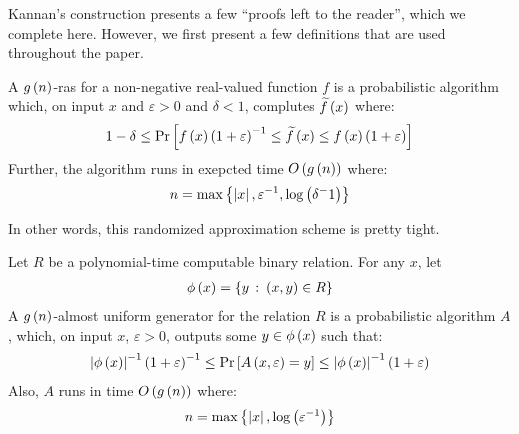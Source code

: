 Kannan's construction presents a few ``proofs left to the reader'',
which we complete here.
However, we first present a few definitions that are used throughout
the paper.

\begin{definition}
  A \(g\left(n\right)\)-ras for a non-negative real-valued function
  \(f\) is a probabilistic algorithm which,
  on input \(x\) and \(\varepsilon > 0\) and \(\delta < 1\),
  complutes \(\widetilde{f}\left(x\right)\) where:
  \begin{align*}
    1 - \delta \leq
    \mathrm{Pr}\left[
      f\left(x\right) \left(1 + \varepsilon\right)^{-1}
        \leq \widetilde{f}\left(x\right)
        \leq f\left(x\right) \left(1 + \varepsilon\right)\right]
  \end{align*}
  Further, the algorithm runs in exepcted time \(O\left(g\left(n\right)\right)\)
  where:
  \begin{align*}
    n = \max\left\{\left\lvert x\right\rvert, \varepsilon^{-1}, \log\left(\delta^-1\right)\right\}
  \end{align*}
\end{definition}

In other words, this randomized approximation scheme is pretty tight.

\begin{definition}
  Let \(R\) be a polynomial-time computable binary relation.
  For any \(x\), let
  \begin{align*}
    \phi\left(x\right) = \left\{y \ \colon \left(x, y\right) \in R\right\}
  \end{align*}
  A \(g\left(n\right)\)-almost uniform generator for the relation
  \(R\) is a probabilistic algorithm \(A\),
  which, on input \(x\), \(\varepsilon > 0\),
  outputs some \(y \in \phi\left(x\right)\) such that:
  \begin{align*}
    \left\lvert\phi\left(x\right)\right\rvert^{-1} \left(1 + \varepsilon\right)^{-1}
      \leq \mathrm{Pr}\left[A\left(x, \varepsilon\right) = y\right]
      \leq \left\lvert\phi\left(x\right)\right\rvert^{-1} \left(1 + \varepsilon\right)
  \end{align*}
  Also, \(A\) runs in time \(O\left(g\left(n\right)\right)\)
  where:
  \begin{align*}
    n = \max\left\{\left\lvert x\right\rvert, \log\left(\varepsilon^{-1}\right)\right\}
  \end{align*}
\end{definition}

